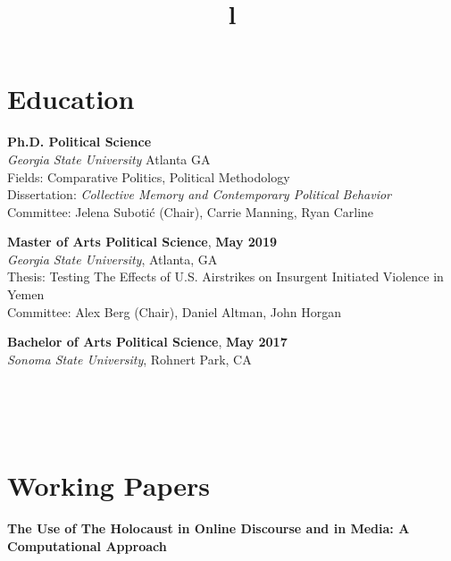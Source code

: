 \documentclass[margin]{res}
\newcommand{\fullhrulefill}{%
  \hspace*{-\sectionwidth}\hrulefill%
  }
\begin{document}
\begin{resume}

\fullhrulefill
\section{Education}
\textbf {Ph.D. Political Science}\\
{\sl Georgia State University} Atlanta GA \\
{Fields: Comparative Politics, Political Methodology} \\
Dissertation: \textit{Collective Memory and Contemporary Political Behavior} \\
Committee: Jelena Subotić (Chair), Carrie Manning, Ryan Carline

\textbf{Master of Arts Political Science}, \hfill{\textbf{May 2019}}\\
{\sl Georgia State University}, Atlanta, GA\\
 Thesis: Testing The Effects of U.S. Airstrikes on Insurgent Initiated Violence in Yemen  \\
Committee: Alex Berg (Chair), Daniel Altman, John Horgan

\textbf{Bachelor of Arts Political Science}, \textbf{\hfill{May 2017}} \\
{\sl Sonoma State University}, Rohnert Park, CA



\begin{format}
\title{l}\\
\\
\body\\
\end{format}


\fullhrulefill
\section{Working Papers}

\textbf{The Use of The Holocaust in Online Discourse and in Media: A Computational Approach }


\end{resume}
\end{document}
